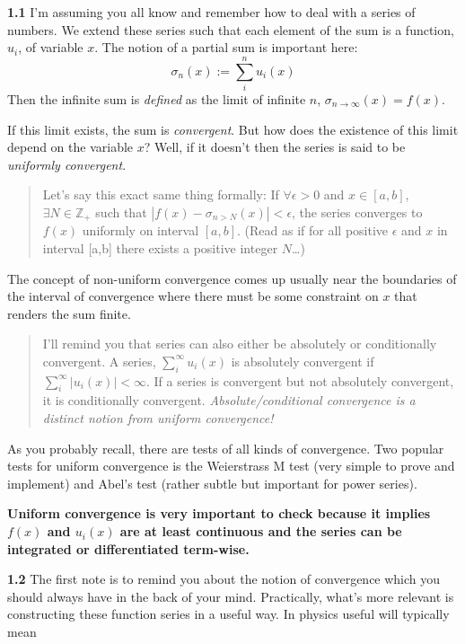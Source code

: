 \documentclass[11pt]{article}
\begin{document}
\textbf{1.1} I'm assuming you all know and remember how to deal with a
series of numbers. We extend these series such that each element of the
sum is a function, \(u_i\), of variable \(x\). The notion of a partial
sum is important here: \[
\sigma_n(x):=\sum^n_iu_i(x)
\] Then the infinite sum is \emph{defined} as the limit of infinite
\(n\), \(\sigma_{n\to \infty}(x)=f(x)\). 
\begin{tcolorbox}[title=Convergence musings]
If this limit exists, the sum
is \emph{convergent}. But how does the existence of this limit depend on
the variable \(x\)? Well, if it doesn't then the series is said to be
\emph{uniformly convergent}.

\begin{quote}
Let's say this exact same thing formally: If \(\forall \epsilon>0\) and
\(x\in[a,b]\), \(\exists N\in \mathbb{Z}_+\) such that
\(|f(x)-\sigma_{n>N}(x)|<\epsilon\), the series converges to \(f(x)\)
uniformly on interval \([a,b]\). (Read as if for all positive
\(\epsilon\) and \(x\) in interval {[}a,b{]} there exists a positive
integer \(N\)\ldots)
\end{quote}

The concept of non-uniform convergence comes up usually near the
boundaries of the interval of convergence where there must be some
constraint on \(x\) that renders the sum finite.

\begin{quote}
I'll remind you that series can also either be absolutely or
conditionally convergent. A series, \(\sum_i^\infty u_i(x)\) is
absolutely convergent if \(\sum_i^\infty |u_i(x)|<\infty\). If a series
is convergent but not absolutely convergent, it is conditionally
convergent. \emph{Absolute/conditional convergence is a distinct notion
from uniform convergence!}
\end{quote}

As you probably recall, there are tests of all kinds of convergence. Two
popular tests for uniform convergence is the Weierstrass M test (very
simple to prove and implement) and Abel's test (rather subtle but
important for power series).

\textbf{Uniform convergence is very important to check because it
implies \(f(x)\) and \(u_i(x)\) are at least continuous and the series
can be integrated or differentiated term-wise.}
\end{tcolorbox}

\textbf{1.2} The first note is to remind you about the notion of
convergence which you should always have in the back of your mind.
Practically, what's more relevant is constructing these function series
in a useful way. In physics useful will typically mean
\end{document}
